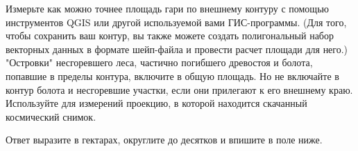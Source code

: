 Измерьте как можно точнее площадь гари по внешнему контуру с помощью инструментов QGIS или другой используемой вами ГИС-программы. (Для того, чтобы сохранить ваш контур, вы также можете создать полигональный набор векторных данных в формате шейп-файла и провести расчет площади для него.) "Островки" несгоревшего леса, частично погибшего древостоя и болота, попавшие в пределы контура, включите в общую площадь. Но не включайте в контур болота и несгоревшие участки, если они прилегают к его внешнему краю. Используйте для измерений проекцию, в которой находится скачанный космический снимок.

Ответ выразите в гектарах, округлите до десятков и впишите в поле ниже.